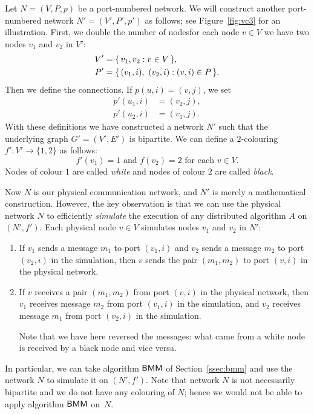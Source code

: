 Let $N = (V,P,p)$ be a port-numbered network. We will construct another port-numbered network $N' = (V'\!,P'\!,p')$ as follows; see Figure~\ref{fig:vc3} for an illustration. First, we double the number of nodes\mydash for each node $v \in V$ we have two nodes $v_1$ and $v_2$ in $V'$:
\begin{align*}
    V' &= \{\,  v_1, v_2 : v \in V  \,\}, \\
    P' &= \{\,  (v_1,i),\ (v_2,i) : (v,i) \in P  \,\}.
\end{align*}
Then we define the connections. If $p(u,i) = (v,j)$, we set
\begin{align*}
    p'(u_1,i) &= (v_2,j), \\
    p'(u_2,i) &= (v_1,j).
\end{align*}
With these definitions we have constructed a network $N'$ such that the underlying graph $G' = (V'\!,E')$ is bipartite. We can define a $2$-colouring $f'\colon V' \to \{1,2\}$ as follows:
\[
    f'(v_1) = 1 \text{ and } f(v_2) = 2 \text{ for each } v \in V.
\]
Nodes of colour $1$ are called \emph{white} and nodes of colour $2$ are called \emph{black}.

Now $N$ is our physical communication network, and $N'$ is merely a mathematical construction. However, the key observation is that we can use the physical network $N$ to efficiently \emph{simulate} the execution of any distributed algorithm $A$ on $(N'\!, f')$. Each physical node $v \in V$ simulates nodes $v_1$ and $v_2$ in $N'$:
\begin{enumerate}
    \item If $v_1$ sends a message $m_1$ to port $(v_1,i)$ and $v_2$ sends a message $m_2$ to port $(v_2,i)$ in the simulation, then $v$ sends the pair $(m_1,m_2)$ to port $(v,i)$ in the physical network.
    \item If $v$ receives a pair $(m_1,m_2)$ from port $(v,i)$ in the physical network, then $v_1$ receives message $m_2$ from port $(v_1,i)$ in the simulation, and $v_2$ receives message $m_1$ from port $(v_2,i)$ in the simulation.
    
    Note that we have here reversed the messages: what came from a white node is received by a black node and vice versa.
\end{enumerate}

In particular, we can take algorithm $\textsf{BMM}$ of Section~\ref{ssec:bmm} and use the network $N$ to simulate it on $(N'\!,f')$. Note that network $N$ is not necessarily bipartite and we do not have any colouring of $N$; hence we would not be able to apply algorithm $\textsf{BMM}$ on~$N$.

